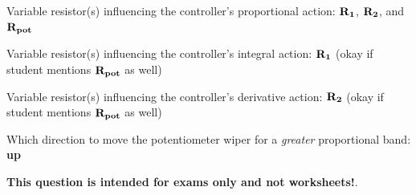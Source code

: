 \vskip 10pt

Variable resistor(s) influencing the controller's proportional action: ${\bf R_1}$, ${\bf R_2}$, and ${\bf R_{pot}}$

\vskip 10pt

Variable resistor(s) influencing the controller's integral action: ${\bf R_1}$ (okay if student mentions ${\bf R_{pot}}$ as well)

\vskip 10pt

Variable resistor(s) influencing the controller's derivative action: ${\bf R_2}$ (okay if student mentions ${\bf R_{pot}}$ as well)

\vskip 10pt

Which direction to move the potentiometer wiper for a {\it greater} proportional band: {\bf up}








{\bf This question is intended for exams only and not worksheets!}.



